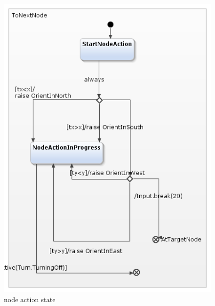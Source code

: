\documentclass[a4paper,12pt,oneside]{book}
\begin{document}
\begin{itemize}
\begin{figure}[]
\begin{minipage}{0.45\textwidth}
\end{minipage}
\end{figure}
\begin{figure}[]
	\centering
	\includegraphics[scale=.6]{node_action.png}
	\caption{node action state}
\end{figure}


\end{itemize}
\end{document}
